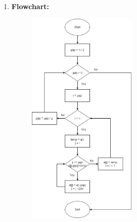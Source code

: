 \documentclass[11pt,a4paper]{article}
\begin{document}
{\begin{enumerate}[label=\textbf{\arabic*})]
\begin{algorithm}
\begin{algorithmic}[1]
            					\State $a[inner] = valueToInsert$
            				\EndFor
            				\State \textcolor{Gray}{/* calculate interval*/}
            				\State $interval = (interval-1)/3$
            			\EndWhile
            		\EndProcedure
            	\end{algorithmic}
            \end{algorithm}
				\item \textbf{Flowchart:}
					\begin{figure}[H]
						\centering 
						\includegraphics[width=0.5\textwidth]{ShellSortFlowchart}
					\end{figure}
					

\end{enumerate}}
\end{document}
